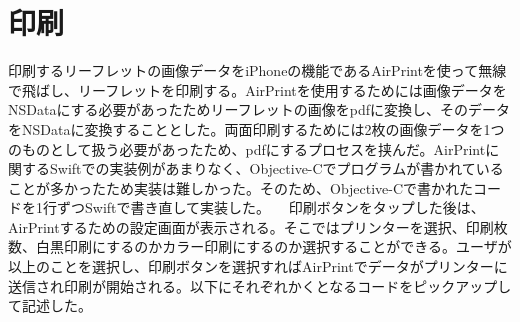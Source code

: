 \section{印刷}
印刷するリーフレットの画像データをiPhoneの機能であるAirPrintを使って無線で飛ばし、リーフレットを印刷する。AirPrintを使用するためには画像データをNSDataにする必要があったためリーフレットの画像をpdfに変換し、そのデータをNSDataに変換することとした。両面印刷するためには2枚の画像データを1つのものとして扱う必要があったため、pdfにするプロセスを挟んだ。AirPrintに関するSwiftでの実装例があまりなく、Objective-Cでプログラムが書かれていることが多かったため実装は難しかった。そのため、Objective-Cで書かれたコードを1行ずつSwiftで書き直して実装した。
　印刷ボタンをタップした後は、AirPrintするための設定画面が表示される。そこではプリンターを選択、印刷枚数、白黒印刷にするのかカラー印刷にするのか選択することができる。ユーザが以上のことを選択し、印刷ボタンを選択すればAirPrintでデータがプリンターに送信され印刷が開始される。以下にそれぞれかくとなるコードをピックアップして記述した。
